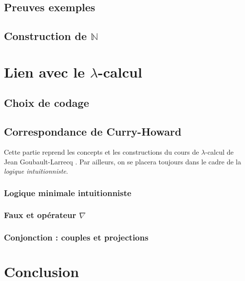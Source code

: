 \documentclass[a4paper]{article}
\newcommand{\N}{\ensuremath{\mathbb{N}}}
\theoremstyle{remark}
\theoremstyle{remark}
\theoremstyle{remark}
\theoremstyle{definition}
\theoremstyle{definition}
\theoremstyle{definition}
\begin{document}
\subsection{Preuves exemples}

\subsection{Construction de $\N$}


\section{Lien avec le $\lambda$-calcul}

\subsection{Choix de codage}

\subsection{Correspondance de {\sc Curry-Howard}}

Cette partie reprend les concepts et les constructions du cours de $\lambda$-calcul de Jean Goubault-Larrecq \cite{polylam}. Par ailleurs, on se placera toujours dans le cadre de la \emph{logique intuitionniste}.

\subsubsection{Logique minimale intuitionniste}

\subsubsection{Faux et opérateur $\nabla$}


\subsubsection{Conjonction : couples et projections}


\section{Conclusion}


\nocite{*}

\end{document}
